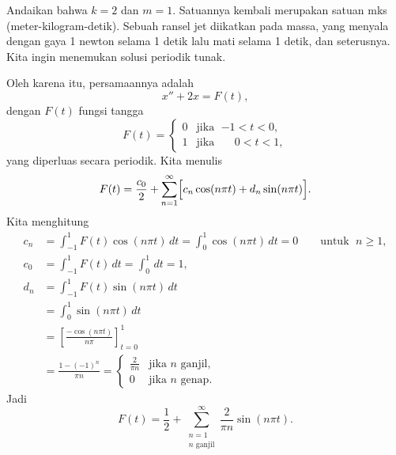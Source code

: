 \begin{example} \label{afs:steadyex}
Andaikan bahwa $k=2$ dan $m=1$.
Satuannya kembali merupakan satuan mks
(meter-kilogram-detik).
Sebuah ransel jet diikatkan pada massa, yang menyala dengan gaya 1
newton selama 1
detik lalu mati selama 1 detik, dan seterusnya.  Kita ingin menemukan solusi periodik
tunak.

Oleh karena itu, persamaannya adalah
\begin{equation*}
x'' + 2 x = F(t) ,
\end{equation*}
dengan $F(t)$ fungsi tangga
\begin{equation*}
F(t) =
\begin{cases}
0 & \text{jika } \; {-1} < t < 0 , \\
1 & \text{jika } \; \phantom{-}0 < t < 1 ,
\end{cases}
\end{equation*}
yang diperluas secara periodik.
Kita menulis
\begin{equation*}
F(t) = \frac{c_0}{2} + \sum_{n=1}^\infty
\Bigl[
c_n \cos (n \pi t) +
d_n \sin (n \pi t)
\Bigr] .
\end{equation*}
Kita menghitung
\begin{align*}
c_n & = \int_{-1}^1 F(t) \cos (n \pi t) \, dt = 
\int_{0}^1 \cos (n \pi t) \, dt = 0 \qquad \text{untuk } \; n \geq 1,
\\
c_0 & = \int_{-1}^1 F(t) \, dt = 
\int_{0}^1 \, dt = 1 ,
\\
d_n & = \int_{-1}^1 F(t) \sin (n \pi t) \, dt
\\
& = \int_{0}^1 \sin (n \pi t) \, dt
\\
& = \left[ \frac{-\cos (n \pi t)}{n \pi} \right]_{t=0}^1
\\
& = \frac{1-{(-1)}^n}{\pi n} =
\begin{cases}
\frac{2}{\pi n} & \text{jika } n \text{ ganjil} , \\
0 & \text{jika } n \text{ genap} .
\end{cases}
\end{align*}
Jadi
\begin{equation*}
F(t) = \frac{1}{2} + \sum_{\substack{n=1 \\ n \text{ ganjil}}}^\infty
\frac{2}{\pi n} \sin (n \pi t) .
\end{equation*}


\end{example}
